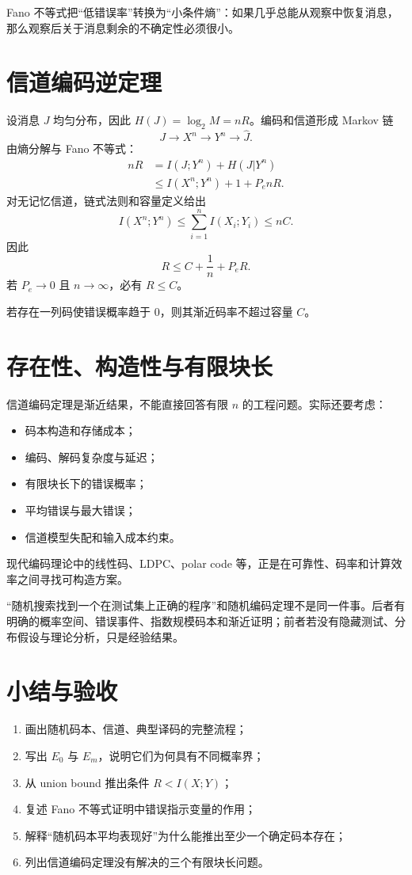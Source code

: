 Fano 不等式把“低错误率”转换为“小条件熵”：如果几乎总能从观察中恢复消息，那么观察后关于消息剩余的不确定性必须很小。

\section{信道编码逆定理}

设消息 $J$ 均匀分布，因此 $H(J)=\log_2M=nR$。编码和信道形成 Markov 链
\[
J\to X^n\to Y^n\to\hat J.
\]
由熵分解与 Fano 不等式：
\begin{align*}
nR
&=I(J;Y^n)+H(J|Y^n)\\
&\le I(X^n;Y^n)+1+P_enR.
\end{align*}
对无记忆信道，链式法则和容量定义给出
\[
I(X^n;Y^n)\le\sum_{i=1}^nI(X_i;Y_i)\le nC.
\]
因此
\[
R\le C+\frac1n+P_eR.
\]
若 $P_e\to0$ 且 $n\to\infty$，必有 $R\le C$。

\begin{theorem}
若存在一列码使错误概率趋于 0，则其渐近码率不超过容量 $C$。
\end{theorem}

\section{存在性、构造性与有限块长}

信道编码定理是渐近结果，不能直接回答有限 $n$ 的工程问题。实际还要考虑：
\begin{itemize}
  \item 码本构造和存储成本；
  \item 编码、解码复杂度与延迟；
  \item 有限块长下的错误概率；
  \item 平均错误与最大错误；
  \item 信道模型失配和输入成本约束。
\end{itemize}
现代编码理论中的线性码、LDPC、polar code 等，正是在可靠性、码率和计算效率之间寻找可构造方案。

\begin{warningbox}
“随机搜索找到一个在测试集上正确的程序”和随机编码定理不是同一件事。后者有明确的概率空间、错误事件、指数规模码本和渐近证明；前者若没有隐藏测试、分布假设与理论分析，只是经验结果。
\end{warningbox}

\section{小结与验收}

\begin{checkpointbox}
\begin{enumerate}
  \item 画出随机码本、信道、典型译码的完整流程；
  \item 写出 $E_0$ 与 $E_m$，说明它们为何具有不同概率界；
  \item 从 union bound 推出条件 $R<I(X;Y)$；
  \item 复述 Fano 不等式证明中错误指示变量的作用；
  \item 解释“随机码本平均表现好”为什么能推出至少一个确定码本存在；
  \item 列出信道编码定理没有解决的三个有限块长问题。
\end{enumerate}
\end{checkpointbox}
